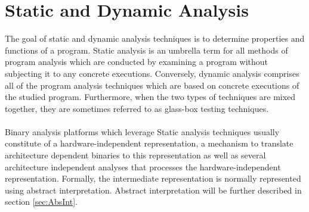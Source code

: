 \documentclass{kththesis}
\begin{document}
\section{Static and Dynamic Analysis}
The goal of static and dynamic analysis techniques is to determine properties and
functions of a program\cite{staticOfInd}. Static analysis is an umbrella term for all methods of program analysis which are conducted by examining a program without subjecting it to any concrete executions. Conversely, dynamic analysis comprises all of the program analysis techniques which are based on concrete executions of the studied program. Furthermore, when the two types of techniques are mixed together, they are sometimes referred to as glass-box testing techniques\cite{DefinitionStaticAnal}.
\\ \\
Binary analysis platforms which leverage Static analysis techniques usually constitute of a hardware-independent representation, a mechanism to translate architecture dependent binaries to this representation as well as several architecture independent analyses that processes the hardware-independent representation\cite{TrABin}. Formally, the intermediate representation is normally represented using abstract interpretation\cite{Jakstab}. Abstract interpretation will be further described in section \ref{sec:AbsInt}.
\end{document}
